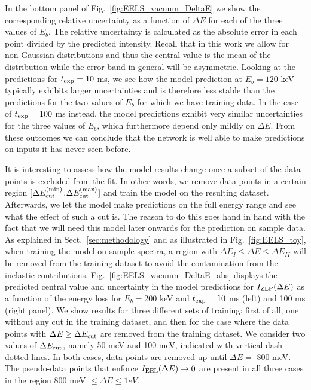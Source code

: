 In the bottom panel of Fig.~\ref{fig:EELS_vacuum_DeltaE} we show
the corresponding relative uncertainty as a function of $\Delta E$
for each of the three values of $E_b$.
%
The relative uncertainty is calculated as the absolute error in each point divided
by the predicted intensity.
%
Recall that in this work we allow for non-Gaussian distributions and thus the central
value is the mean of the distribution while the error band in general will
be asymmetric.
%
Looking at the predictions for $t_{\rm exp}=10$ ms, we see how the model prediction
at $E_b=120$ keV typically exhibits larger uncertainties and is therefore less stable than the predictions
for the two values of $E_b$ for which we have training data.
%
In the case of $t_{\rm exp}=100$ ms instead, the model predictions exhibit very similar
uncertainties for the three values of $E_b$, which furthermore depend only mildly on $\Delta E$.
%
From these outcomes we can conclude that the network is well able to make predictions 
on inputs it has never seen before. 

It is interesting to assess how the model results change once a subset of the data points
is excluded from the fit.
%
In other words, we remove data points in a certain region 
[$\Delta E_{\rm cut}^{\rm (min)}$,$\Delta E_{\rm cut}^{\rm (max)}$]
and train the model on the resulting dataset. 
%
Afterwards, we let the model make predictions on the full energy range and see what the
effect of such a cut is. 
%
The reason to do this goes hand in hand with the fact that we will need this model later onwards
for the prediction on sample data. 
%
As explained in Sect.~\ref{sec:methodology} and as
illustrated in Fig.~\ref{fig:EELS_toy}, when training the model on sample spectra, a region
with $\Delta E_I \le \Delta E \le \Delta E_{II}$ will be removed from the training dataset to avoid the
contamination from the inelastic contributions.
%
Fig.~\ref{fig:EELS_vacuum_DeltaE_abs} displays
the predicted central value and uncertainty in the model predictions for $I_{\rm ZLP}(\Delta E)$
as a function of the energy loss for $E_b=200$ keV and $t_{\rm exp}=10$ ms (left)
and 100 ms (right panel).
%
We show results for three different sets of training: first of all, one without any cut
in the training dataset, and then for the case where the data points with $\Delta E \ge \Delta E_{\rm cut}$
are removed from the training dataset.
%
We consider two values of $\Delta E_{\rm cut}$, namely 50 meV and 100 meV, indicated
with vertical dash-dotted lines.
%
In both cases, data points are removed up until $\Delta E =$ 800 meV. The pseudo-data points 
that enforce $I_{\rm EEL}(\Delta E)\to 0$ are present
in all three cases in the region 800 meV $\le \Delta E \le 1 eV$. 

